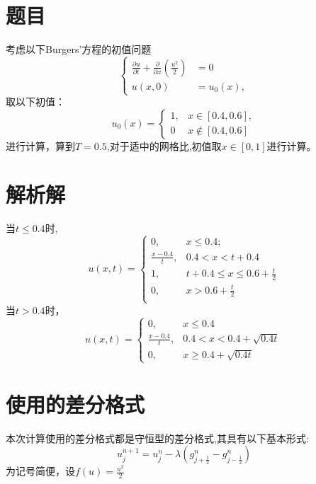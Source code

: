 \documentclass[12pt]{article}
\theoremstyle{remark}
\begin{document}
\title{\textbf{}} 
\author{}
\maketitle
\large
\section{题目}
考虑以下Burgers'方程的初值问题
\begin{equation}
\begin{cases}
\frac{\partial u}{\partial t}+\frac{\partial}{\partial x}(\frac{u^2}{2})&=0\\
u(x,0)&=u_0(x),
\end{cases}
\end{equation}
取以下初值：
\begin{equation}
u_0(x)=\begin{cases}
1,&x \in [0.4,0.6],\\
0&x \notin [0.4,0.6]
\end{cases}
\end{equation}
进行计算，算到$T=0.5$,对于适中的网格比,初值取$x \in [0,1]$进行计算。
\section{解析解}
当$t\leq 0.4$时,
\[
u(x,t)=\begin{cases}
0,&x\leq 0.4;\\
\frac{x-0.4}{t},&0.4<x<t+0.4\\
1,&t+0.4\leq x \leq 0.6+\frac{t}{2}\\
0,&x>0.6+\frac{t}{2}\\
\end{cases}
\]
当$t>0.4$时，
\[
u(x,t)=\begin{cases}
0,&x\leq 0.4 \\
\frac{x-0.4}{t},&0.4<x<0.4+\sqrt{0.4t}\\
0,&x\geq 0.4+\sqrt{0.4t}
\end{cases}
\]
\section{使用的差分格式}
本次计算使用的差分格式都是守恒型的差分格式,其具有以下基本形式:
\begin{equation}
u^{n+1}_j=u^n_j-\lambda(g^n_{j+\frac{1}{2}}-g^n_{j-\frac{1}{2}})
\end{equation}
为记号简便，设$f(u)=\frac{u^2}{2}$
\end{document}
